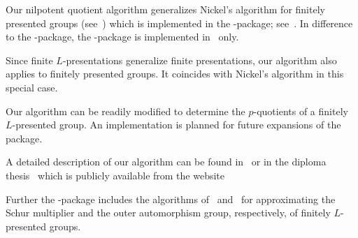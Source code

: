 Our nilpotent quotient algorithm generalizes Nickel's algorithm for
finitely presented groups (see~\cite{Nickel96}) which is implemented in
the {\NQ}-package; see~\cite{nq}. In difference to the {\NQ}-package,
the {\NQL}-package is implemented in \GAP\ only.  

Since finite $L$-presentations generalize finite presentations, our
algorithm also applies to finitely presented groups. It coincides with
Nickel's algorithm in this special case.

Our algorithm can be readily modified to determine the $p$-quotients of
a finitely $L$-presented group. An implementation is planned for future
expansions of the package.

A detailed description of our algorithm can be found in~\cite{BEH08}
or in the diploma thesis~\cite{H08} which is publicly available from
the website 

Further the \NQL-package includes the algorithms of~\cite{Har09}
and~\cite{EH09} for approximating the Schur multiplier and the outer
automorphism group, respectively, of finitely $L$-presented groups.


